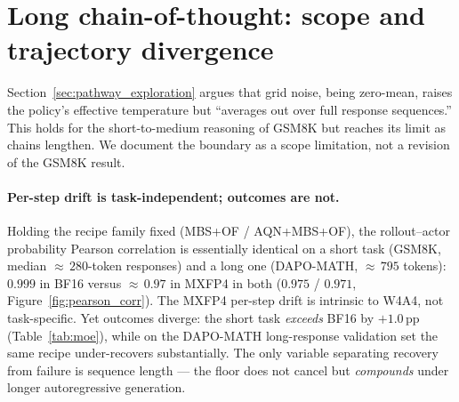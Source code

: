 \documentclass{article}
\theoremstyle{definition}
\theoremstyle{remark}
\begin{document}





\section{Long chain-of-thought: scope and trajectory divergence}
\label{app:longcot}

Section~\ref{sec:pathway_exploration} argues that grid noise, being zero-mean, raises the policy's effective temperature but ``averages out over full response sequences.'' This holds for the short-to-medium reasoning of GSM8K but reaches its limit as chains lengthen. We document the boundary as a scope limitation, not a revision of the GSM8K result.

\paragraph{Per-step drift is task-independent; outcomes are not.}
Holding the recipe family fixed (MBS+OF / AQN+MBS+OF), the rollout--actor probability Pearson correlation is essentially identical on a short task (GSM8K, median ${\approx}\,280$-token responses) and a long one (DAPO-MATH, ${\approx}\,795$ tokens): $0.999$ in BF16 versus ${\approx}\,0.97$ in MXFP4 in both ($0.975$ / $0.971$, Figure~\ref{fig:pearson_corr}). The MXFP4 per-step drift is intrinsic to W4A4, not task-specific. Yet outcomes diverge: the short task \emph{exceeds} BF16 by $+1.0$\,pp (Table~\ref{tab:moe}), while on the DAPO-MATH long-response validation set the same recipe under-recovers substantially. The only variable separating recovery from failure is sequence length --- the floor does not cancel but \emph{compounds} under longer autoregressive generation.
\end{document}
